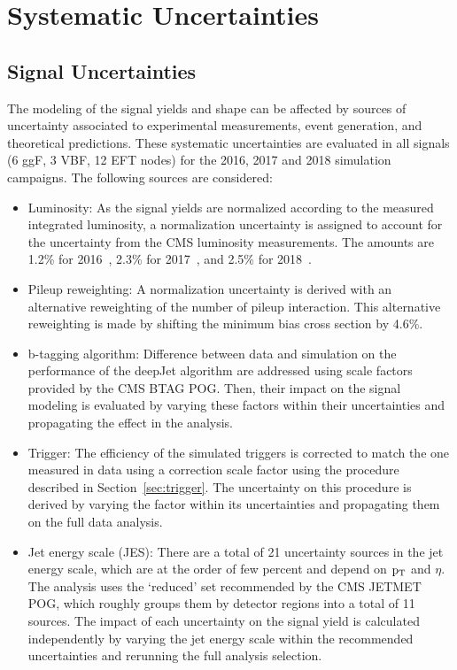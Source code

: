 \section{Systematic Uncertainties} \label{systematics}
\subsection{Signal Uncertainties} \label{sigsystematics}
The modeling of the signal yields and shape can be affected by sources of uncertainty associated to experimental measurements, event generation, and theoretical predictions. These systematic uncertainties are evaluated in all signals (6 ggF, 3 VBF, 12 EFT nodes) for the 2016, 2017 and 2018 simulation campaigns. The following sources are considered:
\begin{itemize}
    \item {Luminosity:} As the signal yields are normalized according to the measured integrated luminosity, a normalization uncertainty is assigned to account for the uncertainty from the CMS luminosity measurements. The amounts are 1.2\% for 2016~\cite{CMS-LUM-17-003}, 2.3\% for 2017~\cite{CMS-PAS-LUM-17-004}, and 2.5\% for 2018~\cite{CMS-PAS-LUM-18-002}.
    \item {Pileup reweighting:} A normalization uncertainty is derived with an alternative reweighting of the number of pileup interaction. This alternative reweighting is made by shifting the minimum bias cross section by 4.6\%.
    \item {b-tagging algorithm:} 
    Difference between data and simulation on the performance of the deepJet algorithm are addressed using scale factors provided by the CMS BTAG POG. Then, their impact on the signal modeling is evaluated by varying these factors within their uncertainties and propagating the effect in the analysis.
    \item {Trigger:} The efficiency of the simulated triggers is corrected to match the one measured in data using a correction scale factor using the procedure described in Section~\ref{sec:trigger}. The uncertainty on this procedure is derived by varying the factor within its uncertainties and propagating them on the full data analysis.
    \item {Jet energy scale (JES):} There are a total of 21 uncertainty sources in the jet energy scale, which are at the order of few percent and depend on $\mathrm{p_{T}}$ and $\eta$. The analysis uses the `reduced' set recommended by the CMS JETMET POG, which roughly groups them by detector regions into a total of 11 sources. The impact of each uncertainty on the signal yield is calculated independently by varying the jet energy scale within the recommended uncertainties and rerunning the full analysis selection. 

\end{itemize}
